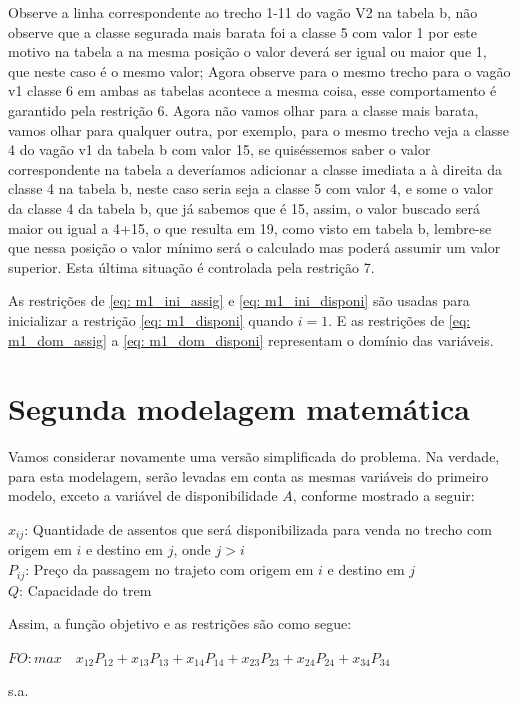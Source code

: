 Observe a linha correspondente ao trecho 1-11 do vagão V2 na tabela b, não observe que a classe segurada mais barata foi a classe 5 com valor 1 por este motivo na tabela a na mesma posição o valor deverá ser igual ou maior que 1, que neste caso é o mesmo valor; Agora observe para o mesmo trecho para o vagão v1 classe 6 em ambas as tabelas acontece a mesma coisa, esse comportamento é garantido pela restrição 6. Agora não vamos olhar para a classe mais barata, vamos olhar para qualquer outra, por exemplo, para o mesmo trecho veja a classe 4 do vagão v1 da tabela b com valor 15, se quiséssemos saber o valor correspondente na tabela a deveríamos adicionar a classe imediata a à direita da classe 4 na tabela b, neste caso seria seja a classe 5 com valor 4, e some o valor da classe 4 da tabela b, que já sabemos que é 15, assim, o valor buscado será maior ou igual a 4+15, o que resulta em 19, como visto em tabela b, lembre-se que nessa posição o valor mínimo será o calculado mas poderá assumir um valor superior. Esta última situação é controlada pela restrição 7.


As restrições de \ref{eq: m1_ini_assig} e \ref{eq: m1_ini_disponi} são usadas para inicializar a restrição \ref{eq: m1_disponi} quando \(i = 1\). E as restrições de \ref{eq: m1_dom_assig} a \ref{eq: m1_dom_disponi} representam o domínio das variáveis.

\section{Segunda modelagem matemática}\label{sec:modelo2}

Vamos considerar novamente uma versão simplificada do problema. Na verdade, para esta modelagem, serão levadas em conta as mesmas variáveis do primeiro modelo, exceto a variável de disponibilidade \(A\), conforme mostrado a seguir:

\noindent $x_{ij}$: Quantidade de assentos que será disponibilizada para venda no trecho com origem em $i$ e destino em $j$, onde $j>i$ \\
\noindent $P_{ij}$: Preço da passagem no trajeto com origem em $i$ e destino em $j$ \\
\noindent $Q$: Capacidade do trem

\noindent Assim, a função objetivo e as restrições são como segue:

$FO: max \quad x_{12}P_{12} + x_{13}P_{13} + x_{14}P_{14} + x_{23}P_{23} + x_{24}P_{24} + x_{34}P_{34}$

s.a.

